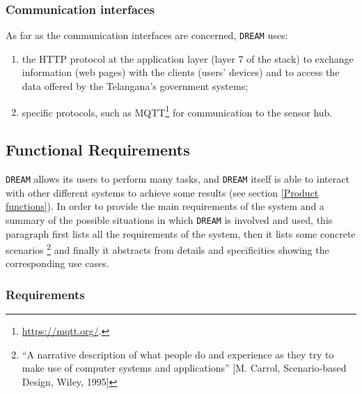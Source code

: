 \documentclass{article}
\begin{document}
\subsubsection{Communication interfaces}
As far as the communication interfaces are concerned, \verb|DREAM| uses:
\begin{enumerate}
    \item the HTTP protocol at the application layer (layer 7 of the stack) to exchange information (web pages) with the clients (users’ devices) and to access the data offered by the Telangana’s government systems;
    \item specific protocols, such as MQTT\footnote{\url{https://mqtt.org/}.} for communication to the sensor hub.
\end{enumerate}

\subsection{Functional Requirements}
\verb |DREAM| allows its users to perform many tasks, and \verb |DREAM| itself is able to interact with other different systems to achieve some results (see section \ref{Product functions}). In order to provide the main requirements of the system and a summary of the possible situations in which \verb |DREAM| is involved and used, this paragraph first lists all the requirements of the system, then it lists some concrete scenarios \footnote{“A narrative description of what people do and experience as
they try to make use of computer systems and applications” [M.
Carrol, Scenario-based Design, Wiley, 1995]} and finally it abstracts from details and specificities showing the corresponding use cases.
\subsubsection{Requirements}
\end{document}
